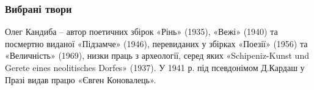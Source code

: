 \subsubsection{Вибрані твори}

Олег Кандиба – автор поетичних збірок «Рінь» (1935), «Вежі»
(1940) та посмертно виданої «Підзамче» (1946), перевиданих у збірках «Поезії»
(1956) та «Величність» (1969), низки праць з археології, серед яких
«Schipeniz-Kunst und Gerete eines neolitisches Dorfes» (1937). У 1941 р. під
псевдонімом Д.Кардаш у Празі видав працю «Євген Коновалець».
